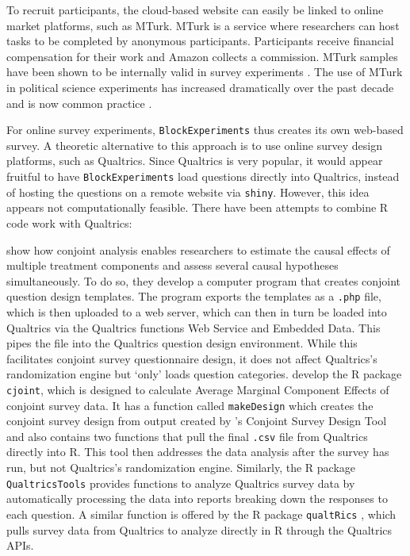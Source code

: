 \documentclass[12pt,]{article}
\begin{document}
To recruit participants, the cloud-based website can easily be linked to
online market platforms, such as MTurk. MTurk is a service where
researchers can host tasks to be completed by anonymous participants.
Participants receive financial compensation for their work and Amazon
collects a commission. MTurk samples have been shown to be internally
valid in survey experiments \citep{berinsky_evaluating_2012}. The use of
MTurk in political science experiments has increased dramatically over
the past decade and is now common practice
\citep{hauser_attentive_2016}.

For online survey experiments, \texttt{BlockExperiments} thus creates
its own web-based survey. A theoretic alternative to this approach is to
use online survey design platforms, such as Qualtrics. Since Qualtrics
is very popular, it would appear fruitful to have
\texttt{BlockExperiments} load questions directly into Qualtrics,
instead of hosting the questions on a remote website via \texttt{shiny}.
However, this idea appears not computationally feasible. There have been
attempts to combine R code work with Qualtrics:

\citet{hainmueller_2014_causal} show how conjoint analysis enables
researchers to estimate the causal effects of multiple treatment
components and assess several causal hypotheses simultaneously. To do
so, they develop a computer program that creates conjoint question
design templates. The program exports the templates as a \texttt{.php}
file, which is then uploaded to a web server, which can then in turn be
loaded into Qualtrics via the Qualtrics functions Web Service and
Embedded Data. This pipes the file into the Qualtrics question design
environment. While this facilitates conjoint survey questionnaire
design, it does not affect Qualtrics's randomization engine but `only'
loads question categories. \citet{barari_2017_package} develop the R
package \texttt{cjoint}, which is designed to calculate Average Marginal
Component Effects of conjoint survey data. It has a function called
\texttt{makeDesign} which creates the conjoint survey design from output
created by \citet{hainmueller_2014_causal}'s Conjoint Survey Design Tool
and also contains two functions that pull the final \texttt{.csv} file
from Qualtrics directly into R. This tool then addresses the data
analysis after the survey has run, but not Qualtrics's randomization
engine. Similarly, the R package \texttt{QualtricsTools}
\citep{testa_2017_qualtricstools} provides functions to analyze
Qualtrics survey data by automatically processing the data into reports
breaking down the responses to each question. A similar function is
offered by the R package \texttt{qualtRics} \citep{ginn_2018_package},
which pulls survey data from Qualtrics to analyze directly in R through
the Qualtrics APIs.
\end{document}
